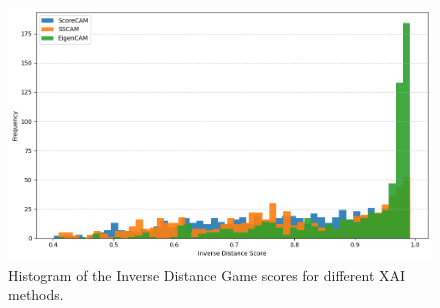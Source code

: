 \begin{figure}[h]
    \centering
    \includegraphics[width=0.8\linewidth]{images/xai-inverse-distance-hist.png}
    \caption{Histogram of the Inverse Distance Game scores for different XAI methods.}
    \label{fig:xai-inverse-distance}
\end{figure}